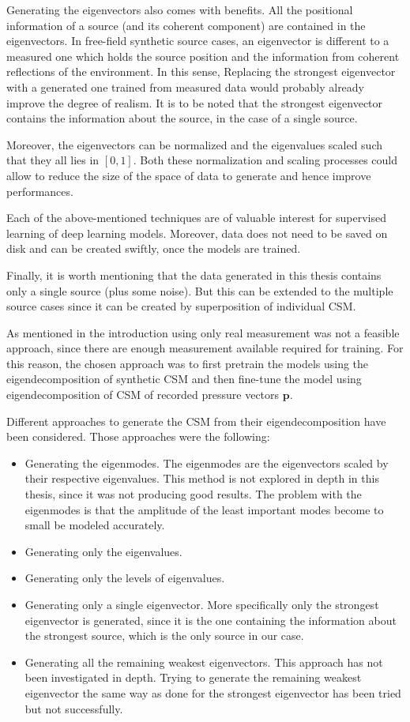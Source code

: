 \documentclass[11pt,a4paper,twoside]{report}
\begin{document}
Generating the eigenvectors also comes with benefits. All the positional information of a source (and its coherent component) are contained in the eigenvectors. In free-field synthetic source cases, an eigenvector is different to a measured one which holds the source position and the information from coherent reflections of the environment. In this sense, Replacing the strongest eigenvector with a generated one trained from measured data would probably already improve the degree of realism. It is to be noted that the strongest eigenvector contains the information about the source, in the case of a single source.

Moreover, the eigenvectors can be normalized and the eigenvalues scaled such that they all lies in $[0,1]$. Both these normalization and scaling processes could allow to reduce the size of the space of data to generate and hence improve performances.

Each of the above-mentioned techniques are of valuable interest for supervised learning of deep learning models. Moreover, data does not need to be saved on disk and can be created swiftly, once the models are trained. 

Finally, it is worth mentioning that the data generated in this thesis contains only a single source (plus some noise). But this can be extended to  the multiple source cases since it can be created by superposition of individual CSM.

As mentioned in the introduction using only real measurement was not a feasible approach, since there are enough measurement available required for training. For this reason, the chosen approach was to first pretrain the models using the eigendecomposition of synthetic CSM and then fine-tune the model using eigendecomposition of CSM of recorded pressure vectors $\mathbf{p}$. 

Different approaches to generate the CSM from their eigendecomposition have been considered. Those approaches were the following:

\begin{itemize}
    \item Generating the eigenmodes. The eigenmodes are the eigenvectors scaled by their respective eigenvalues. This method is not explored in depth in this thesis, since it was not producing good results. The problem with the eigenmodes is that the amplitude of the least important modes become to small be modeled accurately. 
    \item Generating only the eigenvalues.
    \item Generating only the levels of eigenvalues.
    \item Generating only a single eigenvector. More specifically only the strongest eigenvector is generated, since it is the one containing the information about the strongest source, which is the only source in our case. 
    \item Generating all the remaining weakest eigenvectors. This approach has not been investigated in depth. Trying to generate the remaining weakest eigenvector the same way as done for the strongest eigenvector has been tried but not successfully.  
\end{itemize}
\end{document}
